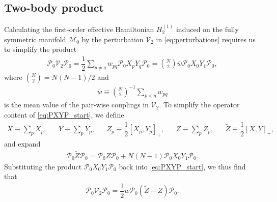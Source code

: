 \documentclass[nofootinbib,notitlepage,11pt]{revtex4-2}
\newcommand{\f}[2]{\dfrac{#1}{#2}} %
\newcommand{\p}[1]{\left(#1\right)} %
\renewcommand{\sp}[1]{\left[#1\right]} %
\newcommand{\1}{\mathds{1}}
\newcommand{\M}{\mathcal{M}}
\renewcommand{\P}{\mathcal{P}}
\newcommand{\V}{\mathcal{V}}
\begin{document}
\subsection{Two-body product}
\label{sec:PXYP}

Calculating the first-order effective Hamiltonian $H_2^{(1)}$ induced
on the fully symmetric manifold $\M_0$ by the perturbation $\V_2$ in
\eqref{eq:perturbations} requires us to simplify the product
\begin{align}
  \P_0 \V_2 \P_0
  = \f12 \sum_{p\ne q} w_{pq} \P_0 X_p Y_q \P_0
  = {N\choose 2} \bar w \P_0 X_0 Y_1 \P_0,
  \label{eq:PXYP_start}
\end{align}
where ${N\choose2}=N\p{N-1}/2$ and
\begin{align}
  \bar w \equiv {N\choose 2}^{-1} \sum_{p<q} w_{pq}
\end{align}
is the mean value of the pair-wise couplings in $\V_2$.  To simplify
the operator content of \eqref{eq:PXYP_start}, we define
\begin{align}
  X \equiv \sum_p X_p,
  &&
  Y \equiv \sum_p Y_p,
  &&
  Z_p \equiv \f12\sp{X_p, Y_p}_+,
  &&
  Z \equiv \sum_p Z_p,
  &&
  \tilde Z \equiv \f12 \sp{X, Y}_+,
\end{align}
and expand
\begin{align}
  \P_0 \tilde Z \P_0 = \P_0 Z \P_0 + N\p{N-1} \P_0 X_0 Y_1 \P_0.
\end{align}
Substituting the product $\P_0 X_0 Y_1 \P_0$ back into
\eqref{eq:PXYP_start}, we thus find that
\begin{align}
  \P_0 \V_2 \P_0 = \f12 \bar w \P_0 \p{\tilde Z -  Z } \P_0.
\end{align}


\end{document}
